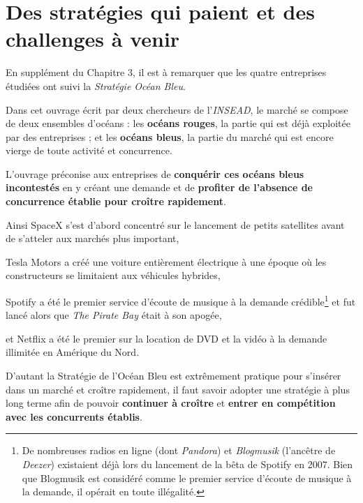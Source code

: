 \chapter{Des stratégies qui paient et des challenges à venir}

En supplément du Chapitre 3, il est à remarquer que les quatre entreprises étudiées ont suivi la \textit{Stratégie Océan Bleu}\supercite{BlueOceanStrategy}.

Dans cet ouvrage écrit par deux chercheurs de l'\textit{INSEAD}, le marché se compose de deux ensembles d'océans : les \textbf{océans rouges}, la partie qui est déjà exploitée par des entreprises ; et les \textbf{océans bleus}, la partie du marché qui est encore vierge de toute activité et concurrence.

L'ouvrage préconise aux entreprises de \textbf{conquérir ces océans bleus incontestés} en y créant une demande et de \textbf{profiter de l'absence de concurrence établie pour croître rapidement}.

\vspace{5mm}

Ainsi SpaceX s'est d'abord concentré sur le lancement de petits satellites avant de s'atteler aux marchés plus important, 

Tesla Motors a créé une voiture entièrement électrique à une époque où les constructeurs se limitaient aux véhicules hybrides, 

Spotify a été le premier service d'écoute de musique à la demande crédible\footnote{De nombreuses radios en ligne (dont \textit{Pandora}) et \textit{Blogmusik} (l'ancêtre de \textit{Deezer}) existaient déjà lors du lancement de la bêta de Spotify en 2007. Bien que Blogmusik est considéré comme le premier service d'écoute de musique à la demande, il opérait en toute illégalité.} et fut lancé alors que \textit{The Pirate Bay} était à son apogée,

et Netflix a été le premier sur la location de DVD et la vidéo à la demande illimitée en Amérique du Nord.

\vspace{5mm}

D'autant la Stratégie de l'Océan Bleu est extrêmement pratique pour s'insérer dans un marché et croître rapidement, il faut savoir adopter une stratégie à plus long terme afin de pouvoir \textbf{continuer à croître} et \textbf{entrer en compétition avec les concurrents établis}.

\vspace{5mm}


